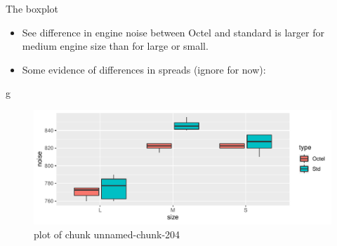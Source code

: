 \documentclass[ignorenonframetext,]{beamer}
\newenvironment{Shaded}{\begin{snugshade}}{\end{snugshade}}
\newcommand{\NormalTok}[1]{#1}
\begin{document}
\begin{frame}[fragile]{The boxplot}
\protect\hypertarget{the-boxplot}{}

\begin{itemize}
\item
  See difference in engine noise between Octel and standard is larger
  for medium engine size than for large or small.
\item
  Some evidence of differences in spreads (ignore for now):
\end{itemize}

\begin{Shaded}
\begin{Highlighting}[]
\NormalTok{g}
\end{Highlighting}
\end{Shaded}

\begin{figure}
\centering
\includegraphics{figure/unnamed-chunk-204-1.pdf}
\caption{plot of chunk unnamed-chunk-204}
\end{figure}

\end{frame}
\end{document}
